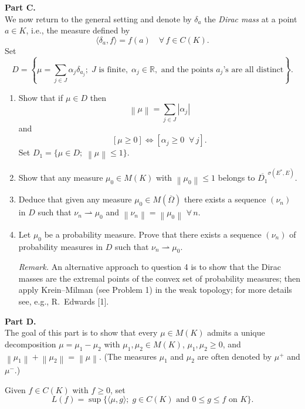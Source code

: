 \documentclass[12pt]{article}
\newcommand{\norm}[1]{\left\|#1\right\|}
\newcommand{\abs}[1]{\left|#1\right|}
\newcommand{\ip}[2]{\langle #1, #2 \rangle}
\newcommand{\R}{\mathbb{R}}
\begin{document}
\noindent\textbf{Part C.}\\
We now return to the general setting and denote by $\delta_a$ the \emph{Dirac mass} at a point
$a \in K$, i.e., the measure defined by
\[
\ip{\delta_a}{f} = f(a) \quad \forall\, f \in C(K).
\]
Set
\[
D = \left\{\mu = \sum_{j \in J} \alpha_j \delta_{a_j};\;
J \text{ is finite},\; \alpha_j \in \R, \text{ and the points } a_j\text{'s are all distinct}\right\}.
\]
 
\begin{enumerate}
\item Show that if $\mu \in D$ then
\[
\norm{\mu} = \sum_{j \in J} \abs{\alpha_j}
\]
and
\[
[\mu \ge 0] \iff [\alpha_j \ge 0\;\; \forall\, j].
\]
Set $D_1 = \{\mu \in D;\; \norm{\mu} \le 1\}$.
 
\item Show that any measure $\mu_0 \in M(K)$ with $\norm{\mu_0} \le 1$ belongs to
$\overline{D_1}^{\sigma(E^*,E)}$.
 
 
\item Deduce that given any measure $\mu_0 \in M(\overline{\Omega})$ there exists a sequence $(\nu_n)$ in $D$
such that $\nu_n \rightharpoonup \mu_0$ and $\norm{\nu_n} = \norm{\mu_0}$ $\forall\, n$.
 
\item Let $\mu_0$ be a probability measure. Prove that there exists a sequence $(\nu_n)$ of
probability measures in $D$ such that $\nu_n \rightharpoonup \mu_0$.
 
\noindent\textit{Remark.} An alternative approach to question 4 is to show that the Dirac masses
are the extremal points of the convex set of probability measures; then apply
Krein--Milman (see Problem 1) in the weak topology; for more details see, e.g.,
R.\ Edwards [1].
\end{enumerate}
 
\noindent\textbf{Part D.}\\
The goal of this part is to show that every $\mu \in M(K)$ admits a unique decomposition
$\mu = \mu_1 - \mu_2$ with $\mu_1, \mu_2 \in M(K)$, $\mu_1, \mu_2 \ge 0$, and
$\norm{\mu_1} + \norm{\mu_2} = \norm{\mu}$.
(The measures $\mu_1$ and $\mu_2$ are often denoted by $\mu^+$ and $\mu^-$.)
 
\medskip
 
\noindent Given $f \in C(K)$ with $f \ge 0$, set
\[
L(f) = \sup\{\ip{\mu}{g};\; g \in C(K) \text{ and } 0 \le g \le f \text{ on } K\}.
\]
 
\end{document}

